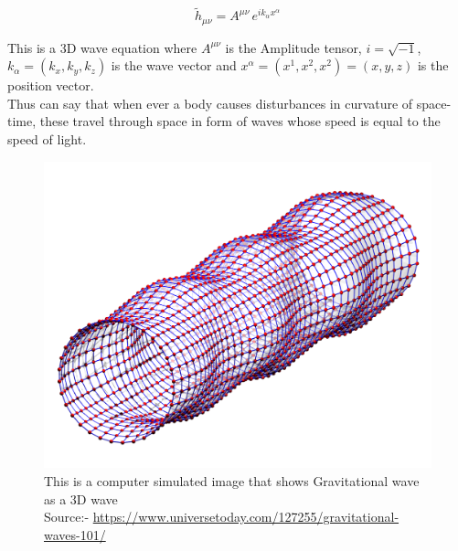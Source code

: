  \begin{equation}
     \tilde{h}_{\mu\nu} = A^{\mu\nu}\, e^{ik_{\alpha}x^{\alpha}}
 \end{equation}
 
 \noindent This is a 3D wave equation where $A^{\mu\nu}$ is the Amplitude tensor, $i = \sqrt{-1} $, $k_{\alpha} = (k_{x},k_{y},k_{z})$ is the wave vector and $x^{\alpha} = (x^{1},x^{2},x^{2}) = (x,y,z)$ is the position vector.
 \\
 
 Thus can say that when ever a body causes disturbances in curvature of space-time, these travel through space in form of waves whose speed is equal to the speed of light.  
 
 \begin{figure}[h]
     \centering
     \includegraphics[scale=0.09]{images.tex/gw_representation.png}
     \caption{This is a computer simulated image that shows Gravitational wave as a 3D wave\\ Source:- \url{https://www.universetoday.com/127255/gravitational-waves-101/}}
 \end{figure}